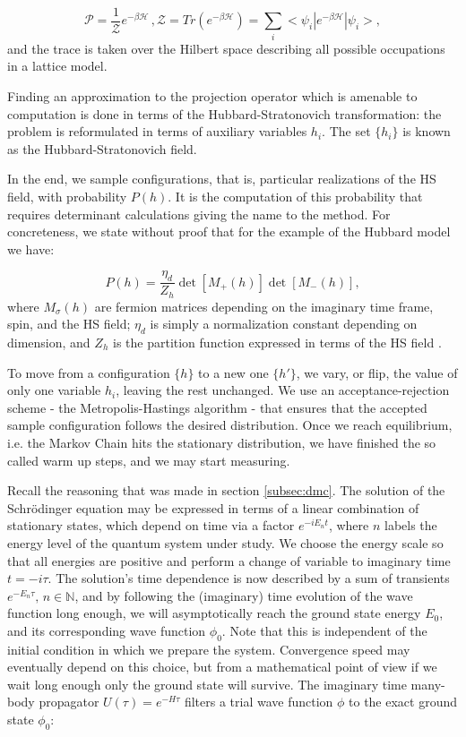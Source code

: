 \documentclass[10pt, twocolumn, twoside]{article}
\begin{document}
\begin{equation}
\mathcal{P} = \frac{1}{\mathcal{Z}}e^{-\beta\mathcal{H}} \, , \mathcal{Z} = Tr (e^{-\beta \mathcal{H}}) = \sum_i < \psi_i | e^{-\beta \mathcal{H}} | \psi_i > ,
\end{equation}
and the trace is taken over the Hilbert space describing all possible occupations in a lattice model.\par

Finding an approximation to the projection operator which is amenable to computation is done in terms of the Hubbard-Stratonovich transformation: the problem is  reformulated in terms of auxiliary variables $h_i$. The set $\{h_i\}$ is known as the Hubbard-Stratonovich field.\par

In the end, we sample configurations, that is, particular realizations of the HS field, with probability $P(h)$. It is the computation of this probability that requires determinant calculations giving the name to the method. For concreteness, we state without proof that for the example of the Hubbard model we have:

\begin{equation}
P(h) = \frac{\eta_d}{Z_h} \det [ M_{+}(h) ] \det [ M_{-}(h) ] ,
\end{equation}
where $M_\sigma (h)$ are fermion matrices depending on the imaginary time frame, spin, and the HS field; $\eta_d$ is simply a normalization constant depending on dimension, and $Z_h$ is the partition function expressed in terms of the HS field \cite{qmc}.

To move from a configuration $\{h\}$ to a new one $\{h'\}$, we vary, or flip, the value of only one variable $h_i$, leaving the rest unchanged. We use an acceptance-rejection scheme - the Metropolis-Hastings algorithm - that ensures that the accepted sample configuration follows the desired distribution. Once we reach equilibrium, i.e. the Markov Chain hits the stationary distribution, we have finished the so called warm up steps, and we may start measuring.\par

Recall the reasoning that was made in section \ref{subsec:dmc}. The solution of the Schr\"odinger equation may be expressed in terms of a linear combination of stationary states, which depend on time via a factor $e^{-iE_n t}$, where $n$ labels the energy level of the quantum system under study. We choose the energy scale so that all energies are positive and perform a change of variable to imaginary time $t= -i\tau$. The solution's time dependence is now described by a sum of transients $e^{-E_n \tau}, \, n \in \mathbb{N}$, and by following the (imaginary) time evolution of the wave function long enough, we will asymptotically reach the ground state energy $E_0$, and its corresponding wave function $\phi_0$. Note that this is independent of the initial condition in which we prepare the system. Convergence speed may eventually depend on this choice, but from a mathematical point of view if we wait long enough only the ground state will survive. The imaginary time many-body propagator $U(\tau) = e^{-H\tau}$ filters a trial wave function $\phi$ to the exact ground state $\phi_0$:
\end{document}

